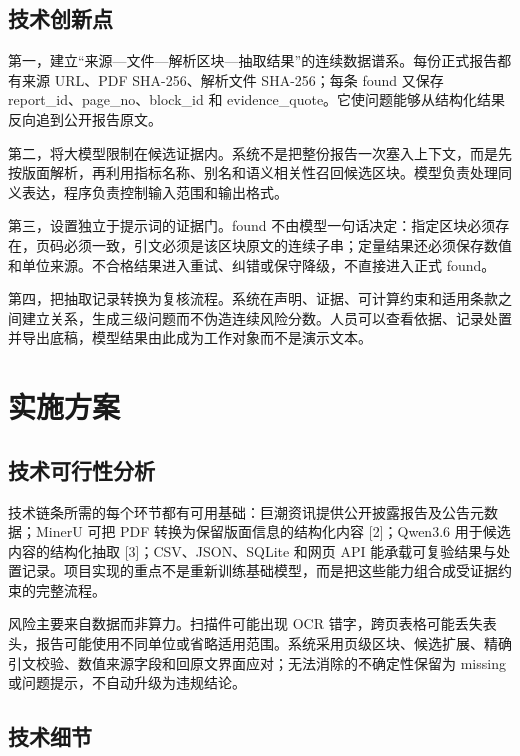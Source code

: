 \documentclass[UTF8,a4paper,11pt]{ctexart}
\begin{document}
\subsection{技术创新点}

第一，建立“来源—文件—解析区块—抽取结果”的连续数据谱系。每份正式报告都有来源 URL、PDF SHA-256、解析文件 SHA-256；每条 found 又保存 report\_id、page\_no、block\_id 和 evidence\_quote。它使问题能够从结构化结果反向追到公开报告原文。\par

第二，将大模型限制在候选证据内。系统不是把整份报告一次塞入上下文，而是先按版面解析，再利用指标名称、别名和语义相关性召回候选区块。模型负责处理同义表达，程序负责控制输入范围和输出格式。\par

第三，设置独立于提示词的证据门。found 不由模型一句话决定：指定区块必须存在，页码必须一致，引文必须是该区块原文的连续子串；定量结果还必须保存数值和单位来源。不合格结果进入重试、纠错或保守降级，不直接进入正式 found。\par

第四，把抽取记录转换为复核流程。系统在声明、证据、可计算约束和适用条款之间建立关系，生成三级问题而不伪造连续风险分数。人员可以查看依据、记录处置并导出底稿，模型结果由此成为工作对象而不是演示文本。\par

\section{实施方案}

\subsection{技术可行性分析}

技术链条所需的每个环节都有可用基础：巨潮资讯提供公开披露报告及公告元数据；MinerU 可把 PDF 转换为保留版面信息的结构化内容 [2]；Qwen3.6 用于候选内容的结构化抽取 [3]；CSV、JSON、SQLite 和网页 API 能承载可复验结果与处置记录。项目实现的重点不是重新训练基础模型，而是把这些能力组合成受证据约束的完整流程。\par

风险主要来自数据而非算力。扫描件可能出现 OCR 错字，跨页表格可能丢失表头，报告可能使用不同单位或省略适用范围。系统采用页级区块、候选扩展、精确引文校验、数值来源字段和回原文界面应对；无法消除的不确定性保留为 missing 或问题提示，不自动升级为违规结论。\par

\subsection{技术细节}
\end{document}
